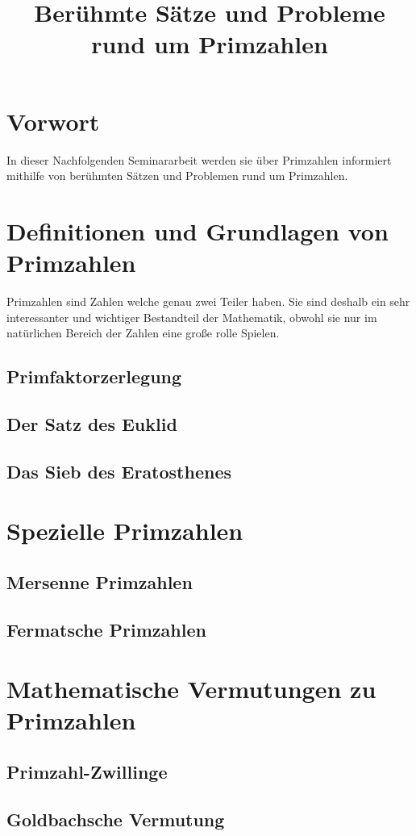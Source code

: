 \documentclass[11pt]{article}
\begin{document}
\title{Berühmte Sätze und Probleme rund um Primzahlen}
\tableofcontents
\newpage
\section*{Vorwort}
In dieser Nachfolgenden Seminararbeit werden sie über Primzahlen informiert mithilfe von
berühmten Sätzen und Problemen rund um Primzahlen.
\newpage
\section{Definitionen und Grundlagen von Primzahlen}
Primzahlen sind Zahlen welche genau zwei Teiler haben. Sie sind deshalb ein sehr interessanter und wichtiger Bestandteil der Mathematik, obwohl sie nur im natürlichen Bereich der Zahlen eine große rolle Spielen.
\subsection{Primfaktorzerlegung}
\subsection{Der Satz des Euklid}
\subsection{Das Sieb des Eratosthenes}
\section{Spezielle Primzahlen}
\subsection{Mersenne Primzahlen}
\subsection{Fermatsche Primzahlen}
\section{Mathematische Vermutungen zu Primzahlen}
\subsection{Primzahl-Zwillinge}
\subsection{Goldbachsche Vermutung}
\end{document}
